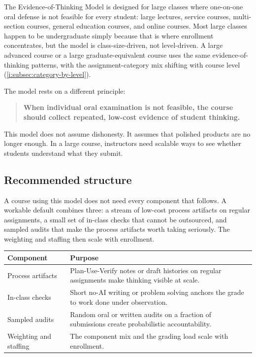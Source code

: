 \documentclass{SIAMbook2023}
\begin{document}
The Evidence-of-Thinking Model is designed for large classes where one-on-one oral defense is not feasible for every student: large lectures, service courses, multi-section courses, general education courses, and online courses. Most large classes happen to be undergraduate simply because that is where enrollment concentrates, but the model is class-size-driven, not level-driven. A large advanced course or a large graduate-equivalent course uses the same evidence-of-thinking patterns, with the assignment-category mix shifting with course level (\cref{i:subsec:category-by-level}).

The model rests on a different principle:

\begin{quote}
\textbf{When individual oral examination is not feasible, the course should collect repeated, low-cost evidence of student thinking.}
\end{quote}

This model does not assume dishonesty. It assumes that polished products are no longer enough. In a large course, instructors need scalable ways to see whether students understand what they submit.

\subsection{Recommended structure}
\label{i:subsec:evidence-structure}

A course using this model does not need every component that follows. A workable default combines three: a stream of low-cost process artifacts on regular assignments, a small set of in-class checks that cannot be outsourced, and sampled audits that make the process artifacts worth taking seriously. The weighting and staffing then scale with enrollment.

\begin{center}
\begin{tabular}{p{}p{}}
\toprule
\textbf{Component} & \textbf{Purpose} \\
\midrule
Process artifacts & Plan-Use-Verify notes or draft histories on regular assignments make thinking visible at scale. \\
In-class checks & Short no-AI writing or problem solving anchors the grade to work done under observation. \\
Sampled audits & Random oral or written audits on a fraction of submissions create probabilistic accountability. \\
Weighting and staffing & The component mix and the grading load scale with enrollment. \\
\bottomrule
\end{tabular}
\end{center}
\end{document}
